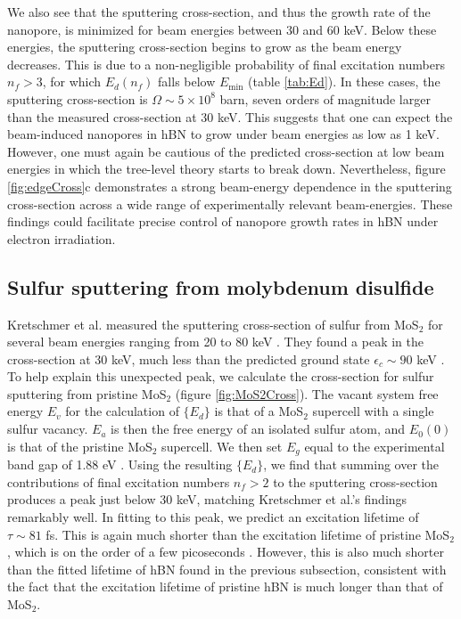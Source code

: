 \documentclass{article}
\begin{document}
We also see that the sputtering cross-section, and thus the growth rate of the
nanopore, is minimized for beam energies between 30 and 60 keV.
Below these energies, the sputtering cross-section begins to grow as the beam
energy decreases.
This is due to a non-negligible probability of final excitation numbers $n_f >
3$, for which $E_d(n_f)$ falls below $E_\text{min}$ (table \ref{tab:Ed}).
In these cases, the sputtering cross-section is $\Omega \sim 5\times10^8$ barn,
seven orders of magnitude larger than the measured cross-section at 30 keV.
This suggests that one can expect the beam-induced nanopores in hBN to grow under
beam energies as low as 1 keV.
However, one must again be cautious of the predicted cross-section at low beam
energies in which the tree-level theory starts to break down.
Nevertheless, figure \ref{fig:edgeCross}c demonstrates a strong beam-energy
dependence in the sputtering cross-section across a wide range of
experimentally relevant beam-energies.
These findings could facilitate precise control of nanopore growth rates in hBN
under electron irradiation.

\subsection{Sulfur sputtering from molybdenum disulfide}
\label{sec:MoS2}

Kretschmer et al. measured the sputtering cross-section of sulfur from MoS$_2$
for several beam energies ranging from 20 to 80 keV \cite{Kretschmer2020}.
They found a peak in the cross-section at 30 keV, much less than the predicted
ground state $\epsilon_c\sim 90$ keV \cite{Kretschmer2020}.
To help explain this unexpected peak, we calculate the cross-section for sulfur
sputtering from pristine MoS$_2$ (figure \ref{fig:MoS2Cross}).
The vacant system free energy $E_v$ for the calculation of $\{E_d\}$ is that of a
MoS$_2$ supercell with a single sulfur vacancy.
$E_a$ is then the free energy of an isolated sulfur atom, and $E_0(0)$ is that
of the pristine MoS$_2$ supercell.
We then set $E_g$ equal to the experimental band gap of 1.88 eV
\cite{Gusakova2017}.
Using the resulting $\{E_d\}$, we find that summing over the contributions
of final excitation numbers $n_f > 2$ to the sputtering cross-section produces
a peak just below 30 keV, matching Kretschmer et al.'s findings remarkably
well.
In fitting to this peak, we predict an excitation lifetime of $\tau \sim 81$
fs.
This is again much shorter than the excitation lifetime of pristine MoS$_2$,
which is on the order of a few picoseconds \cite{Korn2011, Lagarde2014,
Palummo2015a}.
However, this is also much shorter than the fitted lifetime of hBN found in the
previous subsection, consistent with the fact that the excitation lifetime of
pristine hBN is much longer than that of MoS$_2$.
\end{document}
